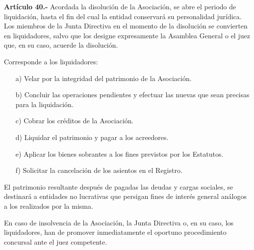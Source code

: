\documentclass[a4paper,12pt]{article}
\begin{document}
\begin{onehalfspace}
\textbf{Artículo 40.-} Acordada la disolución de la Asociación, se abre el periodo de liquidación, hasta el fin del cual la entidad conservará su personalidad jurídica. Los miembros de la Junta Directiva en el momento de la disolución se convierten en liquidadores, salvo que los designe expresamente la Asamblea General o el juez que, en su caso, acuerde la disolución.

Corresponde a los liquidadores:
\begin{itemize}
\item [a)] Velar por la integridad del patrimonio de la Asociación.
\item [b)] Concluir las operaciones pendientes y efectuar las nuevas que sean precisas para la liquidación.
\item [c)] Cobrar los créditos de la Asociación.
\item [d)] Liquidar el patrimonio y pagar a los acreedores.
\item [e)] Aplicar los bienes sobrantes a los fines previstos por los Estatutos.
\item [f)] Solicitar la cancelación de los asientos en el Registro.
\end{itemize}

El patrimonio resultante después de pagadas las deudas y cargas sociales, se destinará a entidades no lucrativas que persigan fines de interés general análogos a los realizados por la misma.

En caso de insolvencia de la Asociación, la Junta Directiva o, en su caso, los liquidadores, han de promover inmediatamente el oportuno procedimiento concursal ante el juez competente.

\end{onehalfspace}
\end{document}
